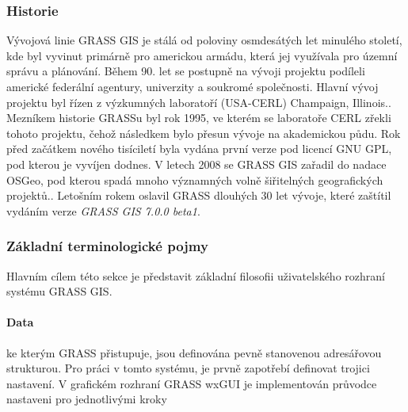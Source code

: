 \documentclass[a4paper,12pt,oneside]{report}
\begin{document}
\subsubsection*{Historie}
Vývojová linie GRASS GIS je stálá od poloviny osmdesátých let minulého století, kde byl vyvinut primárně pro americkou armádu, která jej využívala pro územní správu a plánování. Během 90. let se postupně na vývoji projektu podíleli americké federální agentury, univerzity a soukromé společnosti. Hlavní vývoj projektu byl řízen z výzkumných laboratoří (USA-CERL) Champaign, Illinois.\cite{grasshist}.
Mezníkem historie GRASSu byl rok 1995, ve kterém se laboratoře CERL zřekli tohoto projektu, čehož   následkem bylo přesun vývoje na akademickou půdu. Rok před začátkem nového tisíciletí byla vydána první verze pod licencí GNU GPL, pod kterou je vyvíjen dodnes. V letech 2008 se GRASS GIS zařadil do nadace \acs{OSGeo}, pod kterou spadá mnoho významných volně šiřitelných geografických projektů.. Letošním rokem oslavil GRASS dlouhých 30 let vývoje, které zaštítil vydáním verze \textit{GRASS GIS 7.0.0 beta1}.

\subsubsection*{Základní terminologické pojmy}
\label{subsubsec:grassterminologie}
Hlavním cílem této sekce je představit základní filosofii uživatelského rozhraní systému GRASS GIS.
\paragraph*{Data} ke kterým GRASS přistupuje, jsou definována  pevně stanovenou  adresářovou  strukturou. Pro práci v tomto systému, je prvně zapotřebí definovat trojici nastavení. V grafickém rozhraní GRASS \acs{wxGUI} je implementován průvodce nastaveni pro jednotlivými kroky 
\end{document}
